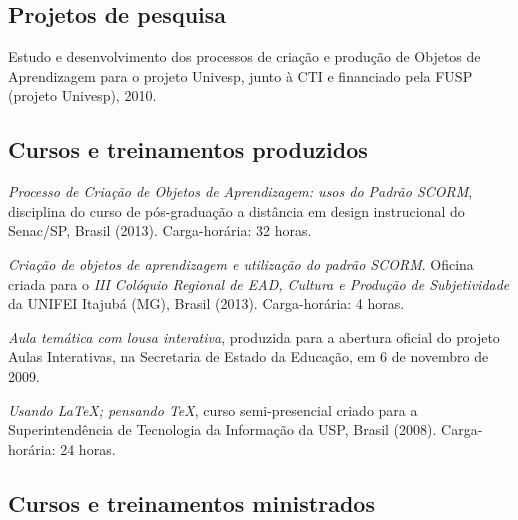 \subsection{Projetos de pesquisa}

\begin{compactitem}
  \item Estudo e desenvolvimento dos processos de criação e produção de Objetos de Aprendizagem para o projeto Univesp, junto à CTI e financiado pela FUSP (projeto Univesp), 2010.
\end{compactitem}

\subsection{Cursos e treinamentos produzidos}

\begin{compactitem}
  \item \textsl{Processo de Criação de Objetos de Aprendizagem: usos do Padrão SCORM}, disciplina do curso de pós-graduação a distância em design instrucional do Senac/SP, Brasil (2013). Carga-horária: 32 horas.
  \item \textsl{Criação de objetos de aprendizagem e utilização do padrão SCORM}. Oficina criada para o \textsl{III Colóquio Regional de EAD, Cultura e Produção de Subjetividade} da UNIFEI Itajubá (MG), Brasil (2013). Carga-horária: 4 horas.
  \item \textsl{Aula temática com lousa interativa}, produzida para a abertura oficial do projeto Aulas Interativas, na Secretaria de Estado da Educação, em 6 de novembro de 2009.
  \item \textsl{Usando \LaTeX; pensando \TeX}, curso semi-presencial criado para a Superintendência de Tecnologia da Informação da USP, Brasil (2008). Carga-horária: 24 horas.
\end{compactitem}

\subsection{Cursos e treinamentos ministrados}

